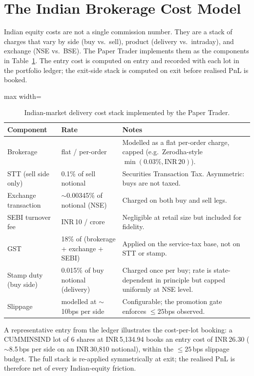 \section{The Indian Brokerage Cost Model}

Indian equity costs are not a single commission number. They are a stack of charges that vary by side (buy vs.\ sell), product (delivery vs.\ intraday), and exchange (NSE vs.\ BSE). The Paper Trader implements them as the components in Table~\ref{tab:cost_model}. The entry cost is computed on entry and recorded with each lot in the portfolio ledger; the exit-side stack is computed on exit before realised PnL is booked.

\begin{table}[H]
\centering
\caption{Indian-market delivery cost stack implemented by the Paper Trader.}
\label{tab:cost_model}
\renewcommand{\arraystretch}{1.35}
\begin{adjustbox}{max width=\textwidth}
\begin{tabularx}{\textwidth}{l l X}
\toprule
\textbf{Component} & \textbf{Rate} & \textbf{Notes} \\
\midrule
Brokerage             & flat / per-order   & Modelled as a flat per-order charge, capped (e.g.\ Zerodha-style $\min(\text{0.03\%}, \text{INR}\,20)$). \\
STT (sell side only)  & 0.1\% of sell notional & Securities Transaction Tax. Asymmetric: buys are not taxed. \\
Exchange transaction  & $\sim$0.00345\% of notional (NSE) & Charged on both buy and sell legs. \\
SEBI turnover fee     & INR\,10 / crore & Negligible at retail size but included for fidelity. \\
GST                   & 18\% of (brokerage + exchange + SEBI) & Applied on the service-tax base, not on STT or stamp. \\
Stamp duty (buy side) & 0.015\% of buy notional (delivery) & Charged once per buy; rate is state-dependent in principle but capped uniformly at NSE level. \\
Slippage              & modelled at $\sim$10bps per side & Configurable; the promotion gate enforces $\leq 25$bps observed. \\
\bottomrule
\end{tabularx}
\end{adjustbox}
\end{table}

A representative entry from the ledger illustrates the cost-per-lot booking: a CUMMINSIND lot of $6$ shares at INR\,5{,}134.94 books an entry cost of INR\,26.30 ($\sim$8.5\,bps per side on an INR\,30{,}810 notional), within the $\leq 25$\,bps slippage budget. The full stack is re-applied symmetrically at exit; the realised PnL is therefore net of every Indian-equity friction.

